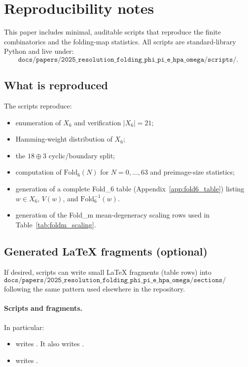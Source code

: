 
\section{Reproducibility notes}
\label{app:reproducibility}

This paper includes minimal, auditable scripts that reproduce the finite combinatorics and the folding-map statistics.
All scripts are standard-library Python and live under:
\[
\texttt{docs/papers/2025\_resolution\_folding\_phi\_pi\_e\_hpa\_omega/scripts/}.
\]

\subsection{What is reproduced}
The scripts reproduce:
\begin{itemize}
\item enumeration of $X_6$ and verification $|X_6|=21$;
\item Hamming-weight distribution of $X_6$;
\item the $18\oplus 3$ cyclic/boundary split;
\item computation of $\mathrm{Fold}_6(N)$ for $N=0,\dots,63$ and preimage-size statistics;
\item generation of a complete Fold\_6 table (Appendix~\ref{app:fold6_table}) listing $w\in X_6$, $V(w)$, and $\mathrm{Fold}_6^{-1}(w)$.
\item generation of the Fold\_m mean-degeneracy scaling rows used in Table~\ref{tab:foldm_scaling}.
\end{itemize}

\subsection{Generated LaTeX fragments (optional)}
If desired, scripts can write small LaTeX fragments (table rows) into
\[
\texttt{docs/papers/2025\_resolution\_folding\_phi\_pi\_e\_hpa\_omega/sections/generated/}
\]
following the same pattern used elsewhere in the repository.

\paragraph{Scripts and fragments.}
In particular:
\begin{itemize}
\item {} writes . It also writes .
\item {} writes .
\end{itemize}


